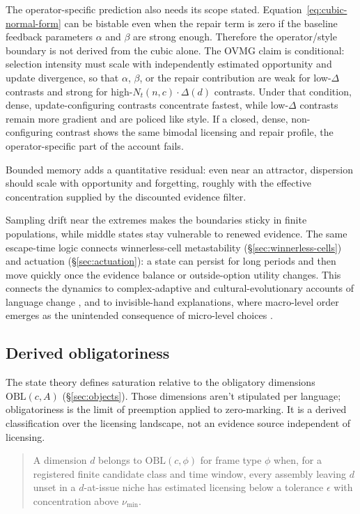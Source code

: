 \documentclass[12pt,letterpaper]{article}
\begin{document}
The operator-specific prediction also needs its scope stated.
Equation~\eqref{eq:cubic-normal-form} can be bistable even when the repair term is zero
if the baseline feedback parameters $\alpha$ and $\beta$ are strong enough.
Therefore the operator/style boundary is not derived from the cubic alone. The
OVMG claim is conditional: selection intensity must scale with independently
estimated opportunity and update divergence, so that $\alpha$, $\beta$, or the
repair contribution are weak for low-$\Delta$ contrasts and strong for
high-$N_t(n,c)\cdot\Delta(d)$ contrasts. Under that condition, dense,
update-configuring contrasts concentrate fastest, while low-$\Delta$ contrasts
remain more gradient and are policed like style. If a closed, dense,
non-configuring contrast shows the same bimodal licensing and repair profile,
the operator-specific part of the account fails.

Bounded memory adds a quantitative residual: even near an attractor, dispersion
should scale with opportunity and forgetting, roughly with the effective
concentration supplied by the discounted evidence filter.

Sampling drift near the extremes makes the boundaries sticky in finite
populations, while middle states stay vulnerable to renewed evidence. The same
escape-time logic connects winnerless-cell metastability (\S\ref{sec:winnerless-cells})
and actuation (\S\ref{sec:actuation}): a state can persist for long periods and
then move quickly once the evidence balance or outside-option utility changes.
This connects the dynamics to complex-adaptive and cultural-evolutionary
accounts of language change \autocite{beckner2009,kirby2014,BlytheCroft2012},
and to invisible-hand explanations, where macro-level order emerges as the
unintended consequence of micro-level choices \autocite{keller1994}.

\subsection{Derived obligatoriness}
\label{sec:derived-obligatoriness}

The state theory defines saturation relative to the obligatory dimensions
$\mathrm{OBL}(c,A)$ (\S\ref{sec:objects}). Those dimensions aren't stipulated
per language; obligatoriness is the limit of preemption applied to
zero-marking. It is a derived classification over the licensing landscape, not
an evidence source independent of licensing.

\begin{quote}
A dimension $d$ belongs to $\mathrm{OBL}(c,\phi)$ for frame type $\phi$ when,
for a registered finite candidate class and time window, every assembly leaving
$d$ unset in a $d$-at-issue niche has estimated licensing below a tolerance
$\epsilon$ with concentration above $\nu_{\min}$.
\end{quote}
\end{document}
